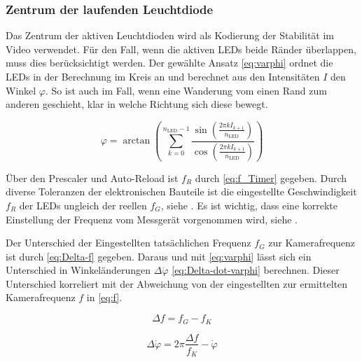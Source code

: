 
\subsubsection{Zentrum der laufenden Leuchtdiode}\label{sec:Zentrum-def-laufenden-Leuchtdiode} %


Das Zentrum der aktiven Leuchtdioden wird als Kodierung der Stabilität im Video verwendet.
Für den Fall, wenn die aktiven LEDs beide Ränder überlappen, muss dies berücksichtigt werden.
%
Der gewählte Ansatz \eqref{eq:varphi} ordnet die LEDs in der Berechnung im Kreis an und berechnet aus den Intensitäten $I$ den Winkel $\varphi$.
%
So ist auch im Fall, wenn eine Wanderung vom einen Rand zum anderen geschieht, klar in welche Richtung sich diese bewegt.

\begin{equation}\label{eq:varphi}
    \varphi = \arctan \left(
    \sum_{k=0}^{n_\text{LED}-1} \frac{
        \sin\left( \frac{2\pi k I_{k+1}}{n_\text{LED}} \right) }{
        \cos\left( \frac{2\pi k I_{k+1}}{n_\text{LED}} \right) }
    \right)
\end{equation}

Über den Prescaler und Auto-Reload ist $f_R$ durch \eqref{eq:f_Timer} gegeben.
Durch diverse Toleranzen der elektronischen Bauteile ist die eingestellte Geschwindigkeit $f_R$ der LEDs ungleich der reellen $f_G$, siehe .
Es ist wichtig, dass eine korrekte Einstellung der Frequenz vom Messgerät vorgenommen wird, siehe .

Der Unterschied der Eingestellten tatsächlichen Frequenz $f_G$ zur Kamerafrequenz ist durch \eqref{eq:Delta-f} gegeben.
Daraus und mit \eqref{eq:varphi} lässt sich ein Unterschied in Winkeländerungen $\Delta\dot\varphi$ \eqref{eq:Delta-dot-varphi} berechnen.
Dieser Unterschied korreliert mit der Abweichung von der eingestellten zur ermittelten Kamerafrequenz $f$ in \eqref{eq:f}.

\begin{equation}\label{eq:Delta-f}
    \Delta f = f_G - f_K
\end{equation}

\begin{equation}\label{eq:Delta-dot-varphi}
    \Delta \dot\varphi = 2\pi\frac{\Delta f}{f_K} - \dot\varphi
\end{equation}

